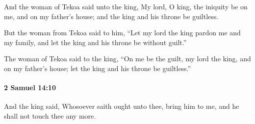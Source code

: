 			\begin{versebox}
					\item[BHS] 
					\item[ASV] And the woman of Tekoa said unto the king, My lord, O king, the iniquity be on me, and on my father's house; and the king and his throne be guiltless.
					\item[NIV] But the woman from Tekoa said to him, “Let my lord the king pardon me and my family, and let the king and his throne be without guilt.”
					\item[NRSV] The woman of Tekoa said to the king, “On me be the guilt, my lord the king, and on my father’s house; let the king and his throne be guiltless.”
			\end{versebox}

		\paragraph{2 Samuel 14:10} %
			\label{2SAMUEL-14-10}

			And the king said, Whosoever saith ought unto thee, bring him to me, and he shall not touch thee any more.

